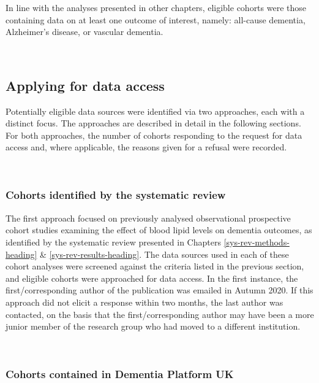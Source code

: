 \documentclass[a4paper, twoside]{templates/ociamthesis}
\begin{document}
In line with the analyses presented in other chapters, eligible cohorts were those containing data on at least one outcome of interest, namely: all-cause dementia, Alzheimer's disease, or vascular dementia.

~

\hypertarget{ipd-apply-access}{%
\subsection{Applying for data access}\label{ipd-apply-access}}

Potentially eligible data sources were identified via two approaches, each with a distinct focus. The approaches are described in detail in the following sections. For both approaches, the number of cohorts responding to the request for data access and, where applicable, the reasons given for a refusal were recorded.

~

\hypertarget{cohorts-identified-by-the-systematic-review}{%
\subsubsection{Cohorts identified by the systematic review}\label{cohorts-identified-by-the-systematic-review}}

The first approach focused on previously analysed observational prospective cohort studies examining the effect of blood lipid levels on dementia outcomes, as identified by the systematic review presented in Chapters \ref{sys-rev-methods-heading} \& \ref{sys-rev-results-heading}. The data sources used in each of these cohort analyses were screened against the criteria listed in the previous section, and eligible cohorts were approached for data access. In the first instance, the first/corresponding author of the publication was emailed in Autumn 2020. If this approach did not elicit a response within two months, the last author was contacted, on the basis that the first/corresponding author may have been a more junior member of the research group who had moved to a different institution.

~

\hypertarget{cohorts-contained-in-dementia-platform-uk}{%
\subsubsection{Cohorts contained in Dementia Platform UK}\label{cohorts-contained-in-dementia-platform-uk}}
\end{document}
